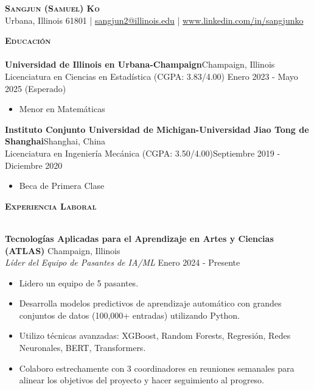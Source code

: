\documentclass[a4paper]{article}
\newcommand{\lineunder} {
    \vspace*{-8pt} \\
    \hspace*{-18pt} \hrulefill \\
}
\newcommand{\header} [1] {
    {\hspace*{-18pt}\vspace*{6pt} \textsc{#1}}
    \vspace*{-6pt} \lineunder
}
\begin{document}
\vspace*{-40pt}

    

\vspace*{-10pt}
\begin{center}
	{\Huge \scshape \textbf{Sangjun (Samuel) Ko}}\\
    Urbana, Illinois 61801 
    | \href{mailto:sangjun2@illinois.edu}{sangjun2@illinois.edu}
    | \href{https://www.linkedin.com/in/sangjunko}{www.linkedin.com/in/sangjunko}

	  
\end{center}

\header{\textbf{Educación}}
\textbf{Universidad de Illinois en Urbana-Champaign}\hfill Champaign, Illinois \\
Licenciatura en Ciencias en Estadística (CGPA: 3.83/4.00) \hfill Enero 2023 - Mayo 2025 (Esperado) \\ 
    \begin{itemize}[noitemsep]
        \item Menor en Matemáticas
    \end{itemize}

\textbf{Instituto Conjunto Universidad de Michigan-Universidad Jiao Tong de Shanghai}\hfill Shanghai, China\\
Licenciatura en Ingeniería Mecánica (CGPA: 3.50/4.00)\hfill Septiembre 2019 - Diciembre 2020\\
    \begin{itemize}[noitemsep]
        \item Beca de Primera Clase
    \end{itemize}


\header{\textbf{Experiencia Laboral}}
\vspace{1mm}

\textbf{Tecnologías Aplicadas para el Aprendizaje en Artes y Ciencias (ATLAS)}
\hfill Champaign, Illinois\\
\textit{Líder del Equipo de Pasantes de IA/ML} \hfill Enero 2024 - Presente\\

    \begin{itemize}[noitemsep]
        \item Lidero un equipo de 5 pasantes.
        \item Desarrolla modelos predictivos de aprendizaje automático con grandes conjuntos de datos (100,000+ entradas) utilizando Python.
        \item Utilizo técnicas avanzadas: XGBoost, Random Forests, Regresión, Redes Neuronales, BERT, Transformers.
        \item Colaboro estrechamente con 3 coordinadores en reuniones semanales para alinear los objetivos del proyecto y hacer seguimiento al progreso.
    \end{itemize}
\end{document}

